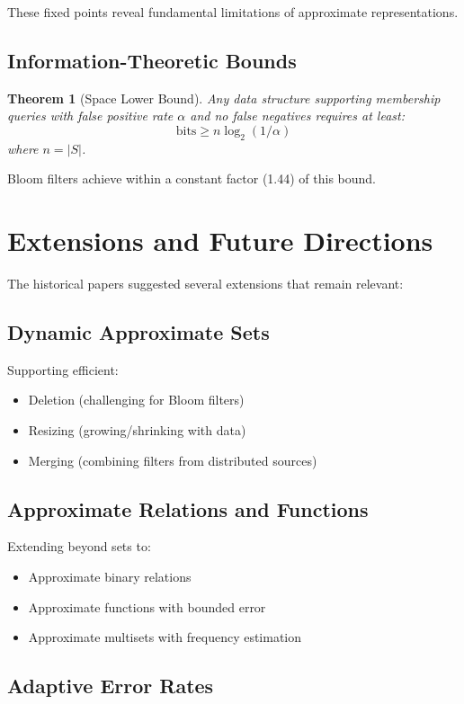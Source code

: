 \documentclass[11pt]{article}
\newtheorem{theorem}{Theorem}[section]
\newcommand{\card}[1]{|#1|}
\newcommand{\fprate}{\alpha}  %
\begin{document}
These fixed points reveal fundamental limitations of approximate representations.

\subsection{Information-Theoretic Bounds}

\begin{theorem}[Space Lower Bound]
Any data structure supporting membership queries with false positive rate $\fprate$ and no false negatives requires at least:
$$\text{bits} \geq n \log_2(1/\fprate)$$
where $n = \card{S}$.
\end{theorem}

Bloom filters achieve within a constant factor (1.44) of this bound.

\section{Extensions and Future Directions}
\label{sec:extensions}

The historical papers suggested several extensions that remain relevant:

\subsection{Dynamic Approximate Sets}

Supporting efficient:
\begin{itemize}
\item Deletion (challenging for Bloom filters)
\item Resizing (growing/shrinking with data)
\item Merging (combining filters from distributed sources)
\end{itemize}

\subsection{Approximate Relations and Functions}

Extending beyond sets to:
\begin{itemize}
\item Approximate binary relations
\item Approximate functions with bounded error
\item Approximate multisets with frequency estimation
\end{itemize}

\subsection{Adaptive Error Rates}
\end{document}

